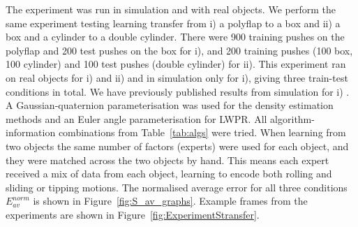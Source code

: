%
The experiment was run in simulation and with real objects. We
perform the same experiment testing learning transfer from i) a
polyflap to a box and ii) a box and a cylinder to a double
cylinder. There were 900 training pushes on the polyflap and 200 test
pushes on the box for i), and 200 training pushes (100 box, 100
cylinder) and 100 test pushes (double cylinder) for ii). This experiment ran on real
objects for i) and ii) and in simulation only for i), giving three
train-test conditions in total. We have previously published results
from simulation for i) \cite{kopicki-etal-icra11}. A
Gaussian-quaternion parameterisation was used for the density
estimation methods and an Euler angle parameterisation for LWPR. All
algorithm-information combinations from Table~\ref{tab:algs} were
tried. When learning from two objects the same number of factors
(experts) were used for each object, and they were matched across the
two objects by hand. This means each expert received a mix of data
from each object, learning to encode both rolling and sliding or
tipping motions. %
The normalised average error for all three conditions $E_{av}^{norm}$
is shown in Figure~\ref{fig:S_av_graphs}. %
Example frames from the experiments are shown in
Figure~\ref{fig:ExperimentStransfer}.


